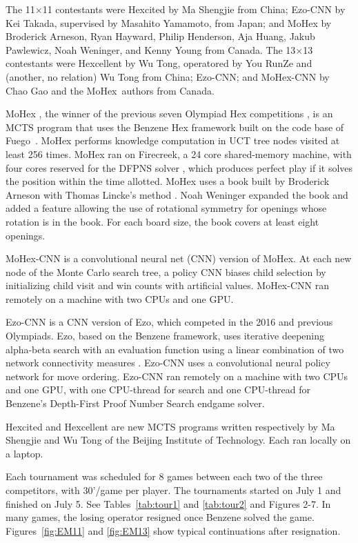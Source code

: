 \documentclass{IOS-Book-Article}
\def\Eo{\mbox{\sc Ezo}}
\def\Ec{\mbox{\sc Ezo-CNN}}
\def\Hite{\mbox{\sc Hexcited}}
\def\Hent{\mbox{\sc Hexcellent}}
\def\Mx{\mbox{\sc MoHex}}
\def\Mc{\mbox{\sc MoHex-CNN}}
\def\Fuego{\mbox{\sc Fuego}}
\begin{document}
The 11$\times$11 contestants were
\Hite{} by Ma Shengjie from China;
\Ec{} by Kei Takada, supervised by Masahito Yamamoto, from Japan;
and \Mx{}
by Broderick Arneson, Ryan Hayward, Philip Henderson, Aja Huang, 
Jakub Pawlewicz, Noah Weninger, and Kenny Young from Canada.
The 13$\times$13 contestants were
\Hent{} by Wu Tong, operatored by You RunZe and (another, no relation)
Wu Tong from China;
\Ec{}; and
\Mc{} by Chao Gao and the \Mx\ authors from Canada.

\Mx{} \cite{HAHMP13},
the winner of the previous seven Olympiad Hex competitions \cite{HAHP13},
is an MCTS program that uses the Benzene Hex framework
built on the code base of \Fuego\ \cite{fuego}.
\Mx{} performs knowledge computation 
in UCT tree nodes visited at least 256 times.
\Mx{} ran on Firecreek, a 24 core shared-memory machine, 
with four cores reserved for the 
DFPNS solver \cite{PawlH13}, which
produces perfect play if it solves the
position within the time allotted.
\Mx{} uses a book built by Broderick Arneson with Thomas Lincke's method 
\cite{DBLP:conf/cg/Lincke00}. 
Noah Weninger expanded the book and added a feature
allowing the use of rotational symmetry for openings
whose rotation is in the book.
For each board size, the book covers at least eight openings.

\Mc{} is a convolutional neural net (CNN) version of \Mx{}. 
At each new node of the Monte Carlo search tree, 
a policy CNN biases child selection by
initializing child visit and win counts with artificial values.
\Mc{} ran remotely on a machine with two CPUs and one GPU.

\Ec{} is a CNN version of \Eo{}, which competed
in the 2016 and previous Olympiads.
\Eo{}, based on the Benzene framework, 
uses iterative deepening alpha-beta search 
with an evaluation function using a linear combination of
two network connectivity measures \cite{TakadaHIY15}.
\Ec{} uses a convolutional neural policy network
for move ordering.
\Ec{} ran remotely on a machine
with two CPUs and one GPU,
with one CPU-thread for search and one CPU-thread for
Benzene's Depth-First Proof Number Search endgame solver.

\Hite{} and \Hent{} are new MCTS programs written 
respectively by Ma Shengjie and Wu Tong
of the Beijing Institute of Technology.
Each ran locally on a laptop.

Each tournament was scheduled for 8 games between
each two of the three competitors, with 30'/game per player.
The tournaments started on July 1 and finished on July 5.
See Tables~\ref{tab:tour1} and \ref{tab:tour2} and Figures 2-7.
In many games, the losing operator resigned once Benzene solved the game.
Figures~\ref{fig:EM11} and \ref{fig:EM13} show typical continuations
after resignation.
\end{document}
